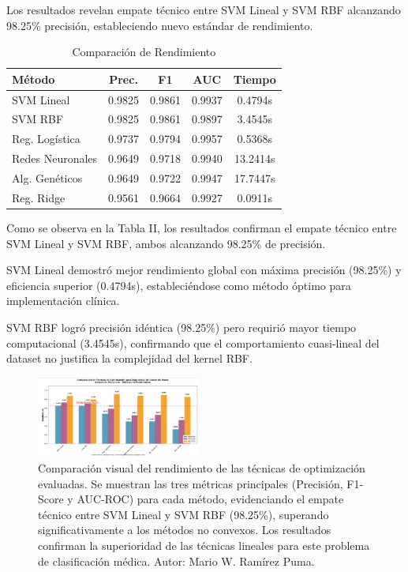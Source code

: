 \documentclass[conference]{IEEEtran}
\begin{document}
Los resultados revelan empate técnico entre SVM Lineal y SVM RBF alcanzando 98.25\% precisión, estableciendo nuevo estándar de rendimiento.

\begin{table}[htbp]
\caption{Comparación de Rendimiento}
\begin{center}
\footnotesize
\begin{tabular}{|l|c|c|c|c|}
\hline
\textbf{Método} & \textbf{Prec.} & \textbf{F1} & \textbf{AUC} & \textbf{Tiempo} \\
\hline
SVM Lineal & 0.9825 & 0.9861 & 0.9937 & 0.4794s \\
\hline
SVM RBF & 0.9825 & 0.9861 & 0.9897 & 3.4545s \\
\hline
Reg. Logística & 0.9737 & 0.9794 & 0.9957 & 0.5368s \\
\hline
Redes Neuronales & 0.9649 & 0.9718 & 0.9940 & 13.2414s \\
\hline
Alg. Genéticos & 0.9649 & 0.9722 & 0.9947 & 17.7447s \\
\hline
Reg. Ridge & 0.9561 & 0.9664 & 0.9927 & 0.0911s \\
\hline
\end{tabular}
\label{tab2}
\end{center}
\end{table}


Como se observa en la Tabla II, los resultados confirman el empate técnico entre SVM Lineal y SVM RBF, ambos alcanzando 98.25\% de precisión.

SVM Lineal demostró mejor rendimiento global con máxima precisión (98.25\%) y eficiencia superior (0.4794s), estableciéndose como método óptimo para implementación clínica.

SVM RBF logró precisión idéntica (98.25\%) pero requirió mayor tiempo computacional (3.4545s), confirmando que el comportamiento cuasi-lineal del dataset no justifica la complejidad del kernel RBF.
\begin{figure}[htbp]
\centering
\includegraphics[width=0.48\textwidth]{CAP3.png}
\caption{Comparación visual del rendimiento de las técnicas de optimización evaluadas. Se muestran las tres métricas principales (Precisión, F1-Score y AUC-ROC) para cada método, evidenciando el empate técnico entre SVM Lineal y SVM RBF (98.25\%), superando significativamente a los métodos no convexos. Los resultados confirman la superioridad de las técnicas lineales para este problema de clasificación médica. Autor: Mario W. Ramírez Puma.}
\label{fig:comparacion_rendimiento}
\end{figure}
\end{document}
